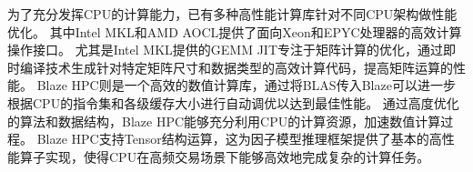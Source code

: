 为了充分发挥CPU的计算能力，已有多种高性能计算库针对不同CPU架构做性能优化。
其中Intel MKL和AMD AOCL提供了面向Xeon和EPYC处理器的高效计算操作接口。
尤其是Intel MKL提供的GEMM JIT专注于矩阵计算的优化，通过即时编译技术生成针对特定矩阵尺寸和数据类型的高效计算代码，提高矩阵运算的性能。
Blaze HPC则是一个高效的数值计算库，通过将BLAS传入Blaze可以进一步根据CPU的指令集和各级缓存大小进行自动调优以达到最佳性能。
通过高度优化的算法和数据结构，Blaze HPC能够充分利用CPU的计算资源，加速数值计算过程。
Blaze HPC支持Tensor结构运算，这为因子模型推理框架提供了基本的高性能算子实现，使得CPU在高频交易场景下能够高效地完成复杂的计算任务。
